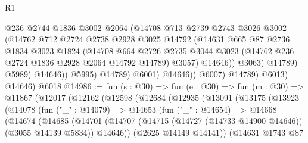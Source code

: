 \begin{lexlean}{R1}
\begin{coremodule}
                              @236
                              @2744
                              @1836
                              @3002
                              @2064
                              (@14708
                                @713
                                @2739
                                @2743
                                @3026
                                @3002
                                (@14762
                                  @712
                                  @2724
                                  @2738
                                  @2928
                                  @3025
                                  @14792
                                  (@14631
                                    @665
                                    @87
                                    @2736
                                    @1834
                                    @3023
                                    @1824
                                    (@14708
                                      @664
                                      @2726
                                      @2735
                                      @3044
                                      @3023
                                      (@14762 @236 @2724 @1836 @2928 @2064 @14792 @14789)
                                      @3057)
                                    @14646))
                                @3063)
                              @14789)
                            @5989)
                          @14646))
                      @5995)
                    @14789)
                  @6001)
                @14646))
            @6007)
          @14789)
        @6013)
      @14646)
    @6018
@14986 := fun (s : @30) =>
  fun (e : @30) =>
  fun (m : @30) =>
  @11867
    (@12017
      (@12162
        (@12598
          (@12684
            (@12935
              (@13091
                (@13175
                  (@13923
                    (@14078
                      (fun ("_" : @14079) =>
                      @14653
                        (fun ("_" : @14654) =>
                        @14668
                          (@14674
                            (@14685
                              (@14701
                                (@14707
                                  (@14715 (@14727 (@14733 @14900 @14646)) (@3055 @14139 @5834))
                                  @14646))
                              (@2625 @14149 @14141))
                            (@14631
                              @1743
                              @87

\end{coremodule}
\end{lexlean}
